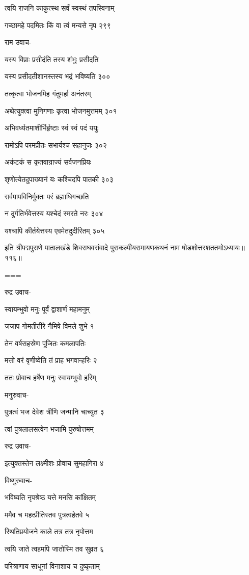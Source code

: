 त्वयि राजनि काकुत्स्थ सर्वं स्वस्थं तपस्विनाम्

गच्छामहे पदमितः किं वा त्वं मन्यसे नृप २९९

राम उवाच-

यस्य विप्राः प्रसीदंति तस्य शंभुः प्रसीदति

यस्य प्रसीदतीशानस्तस्य भद्रं भविष्यति ३००

तत्कृत्वा भोजनमिह गंतुमर्हा अनंतरम्

अथेत्युक्त्वा मुनिगणाः कृत्वा भोजनमुत्तमम् ३०१

अभिवर्ध्यतमाशीर्भिर्हृष्टाः स्वं स्वं पदं ययुः

रामोऽपि परमप्रीतः सभार्यश्च सहानुजः ३०२

अकंटकं स कृतवान्राज्यं सर्वजनप्रियः

शृणोत्येतदुपाख्यानं यः कश्चिदपि पातकी ३०३

सर्वपापविनिर्मुक्तः परं ब्रह्माधिगच्छति

न दुर्गतिर्भवेत्तस्य यश्चेदं स्मरते नरः ३०४

यश्चापि कीर्तयेत्तस्य एवमेतदुदीरितम् ३०५

इति श्रीपद्मपुराणे पातालखंडे शिवराघवसंवादे पुराकल्पीयरामायणकथनं नाम षोडशोत्तरशततमोऽध्यायः॥११६॥


===


रुद्र उवाच-

स्वायम्भुवो मनुः पूर्वं द्वाशार्णं महामनुम्

जजाप गोमतीतीरे नैमिषे विमले शुभे १

तेन वर्षसहस्रेण पूजितः कमलापतिः

मत्तो वरं वृणीष्वेति तं प्राह भगवान्हरिः २

ततः प्रोवाच हर्षेण मनुः स्वायम्भुवो हरिम्

मनुरुवाच-

पुत्रत्वं भज देवेश त्रीणि जन्मानि चाच्युत ३

त्वां पुत्रलालसत्वेन भजामि पुरुषोत्तमम्

रुद्र उवाच-

इत्युक्तस्तेन लक्ष्मीशः प्रोवाच सुमहागिरा ४

विष्णुरुवाच-

भविष्यति नृपश्रेष्ठ यत्ते मनसि कांक्षितम्

ममैव च महत्प्रीतिस्तव पुत्रत्वहेतवे ५

स्थितिप्रयोजने काले तत्र तत्र नृपोत्तम

त्वयि जाते त्वहमपि जातोस्मि तव सुव्रत ६

परित्राणाय साधूनां विनाशाय च दुष्कृताम्

